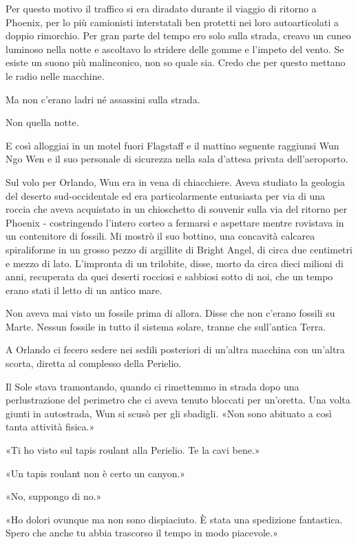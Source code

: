 Per questo motivo il traffico si era diradato durante il viaggio di
ritorno a Phoenix, per lo più camionisti interstatali ben protetti nei
loro autoarticolati a doppio rimorchio. Per gran parte del tempo ero
solo sulla strada, creavo un cuneo luminoso nella notte e ascoltavo lo
stridere delle gomme e l'impeto del vento. Se esiste un suono più
malinconico, non so quale sia. Credo che per questo mettano le radio
nelle macchine.

Ma non c'erano ladri né assassini sulla strada.

Non quella notte.

\separatorefiori

E così alloggiai in un motel fuori Flagstaff e il mattino seguente
raggiunsi Wun Ngo Wen e il suo personale di sicurezza nella sala
d'attesa privata dell'aeroporto.

Sul volo per Orlando, Wun era in vena di chiacchiere. Aveva studiato la
geologia del deserto sud-occidentale ed era particolarmente entusiasta
per via di una roccia che aveva acquistato in un chioschetto di souvenir
sulla via del ritorno per Phoenix - costringendo l'intero corteo a
fermarsi e aspettare mentre rovistava in un contenitore di fossili. Mi
mostrò il suo bottino, una concavità calcarea spiraliforme in un grosso
pezzo di argillite di Bright Angel, di circa due centimetri e mezzo di
lato. L'impronta di un trilobite, disse, morto da circa dieci milioni di
anni, recuperata da quei deserti rocciosi e sabbiosi sotto di noi, che
un tempo erano stati il letto di un antico mare.

Non aveva mai visto un fossile prima di allora. Disse che non c'erano
fossili su Marte. Nessun fossile in tutto il sistema solare, tranne che
sull'antica Terra.

\separatorefiori

A Orlando ci fecero sedere nei sedili posteriori di un'altra macchina
con un'altra scorta, diretta al complesso della Perielio.

Il Sole stava tramontando, quando ci rimettemmo in strada dopo una
perlustrazione del perimetro che ci aveva tenuto bloccati per un'oretta.
Una volta giunti in autostrada, Wun si scusò per gli sbadigli. «Non sono
abituato a così tanta attività fisica.»

«Ti ho visto sul tapis roulant alla Perielio. Te la cavi bene.»

«Un tapis roulant non è certo un canyon.»

«No, suppongo di no.»

«Ho dolori ovunque ma non sono dispiaciuto. È stata una spedizione
fantastica. Spero che anche tu abbia trascorso il tempo in modo
piacevole.»

